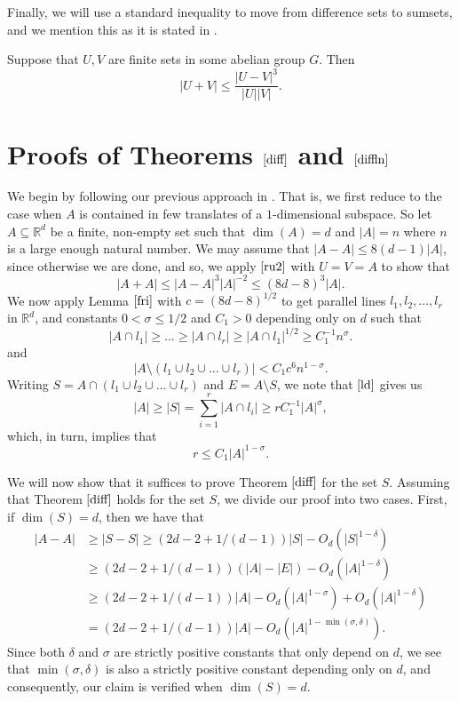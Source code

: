 Finally, we will use a standard inequality to move from difference sets to sumsets, and we mention this as it is stated in \cite[Corollary 2.12]{TV2006}.

\begin{lemma} \label{rusza}
Suppose that $U,V$ are finite sets in some abelian group $G$. Then 
\begin{equation} \label{ru2} |U+V| \leq \frac{|U-V|^3}{|U||V|}.  \end{equation}
\end{lemma}


\section{Proofs of Theorems $\ref{diff}$ and $\ref{diffln}$}

We begin by following our previous approach in \cite{Ak2021}. That is, we first reduce to the case when $A$ is contained in few translates of a $1$-dimensional subspace. So let $A \subseteq \mathbb{R}^d$ be a finite, non-empty set such that $\dim(A) = d$ and $|A| = n$ where $n$ is a large enough natural number. We may assume that $|A-A| \leq 8(d-1)|A|$, since otherwise we are done, and so, we apply $\eqref{ru2}$ with $U= V = A$ to show that
\[ |A+A| \leq |A-A|^3 |A|^{-2} \leq (8d-8)^3 |A|. \]
We now apply Lemma $\ref{fri}$ with $c = (8d-8)^{1/2}$ to get parallel lines $l_1, l_2, \dots, l_r$ in $\mathbb{R}^d$, and constants $0 < \sigma \leq 1/2$ and $C_1 > 0$ depending only on $d$ such that 
\begin{equation} \label{ld}
 |A \cap l_1| \geq \dots \geq  |A \cap l_r| \geq  |A \cap l_1|^{1/2} \geq C_1^{-1} n^{\sigma}. 
 \end{equation}
and 
\[ |A\setminus (l_1 \cup l_2 \cup \dots \cup l_r)| < C_1 c^{6} n^{1-\sigma}. \]
Writing $S = A \cap (l_1 \cup l_2 \cup \dots \cup l_r)$ and $E = A \setminus S$, we note that $\eqref{ld}$ gives us 
\[ |A| \geq |S| = \sum_{i=1}^{r} |A \cap l_i| \geq r C_1^{-1} |A|^{\sigma}, \]
which, in turn, implies that
\begin{equation} \label{ubr}
 r \leq C_1 |A|^{1-\sigma}.
 \end{equation}
\par

We will now show that it suffices to prove Theorem $\ref{diff}$ for the set $S$. Assuming that Theorem $\ref{diff}$ holds for the set $S$, we divide our proof into two cases. First, if $\dim(S) = d$, then we have that
\begin{align*}
|A-A|  &  \geq |S-S| \geq (2d-2  +  1/({d -1}))|S| - O_d(|S|^{1- \delta}) \\
& \geq (2d-2 + 1/({d -1}))(|A| - |E|) - O_d(|A|^{1-\delta}) \\
& \geq (2d-2  +  1/({d -1}))|A| - O_d(|A|^{1 - \sigma}) + O_d(|A|^{1-\delta}) \\
& = (2d-2  +  1/({d -1}))|A| - O_d(|A|^{1- \min{(\sigma, \delta)}}).
\end{align*}
Since both $\delta$ and $\sigma$ are strictly positive constants that only depend on $d$, we see that $\min{(\sigma, \delta)}$ is also a strictly positive constant depending only on $d$, and consequently, our claim is verified when $\dim(S) =d$.
\par

